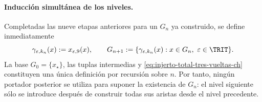 \paragraph{Inducción simultánea de los niveles.}
Completadas las nueve etapas anteriores para un \(G_n\) ya construido,
se define inmediatamente
\begin{equation}
 \gamma_{\varepsilon,k_n}(x):=x_{\varepsilon,9}(x),\qquad
 G_{n+1}:=\{\gamma_{\varepsilon,k_n}(x):
       x\in G_n,\ \varepsilon\in\TRIT\}.
 \label{eq:injerto-total-tres-vueltas-ch}
\end{equation}
\label{eq:tres-vueltas-tpk-ch}
La base \(G_0=\{x_\star\}\), las tuplas intermedias y
\eqref{eq:injerto-total-tres-vueltas-ch} constituyen una única definición por
recursión sobre \(n\). Por tanto, ningún portador posterior se utiliza para
suponer la existencia de \(G_n\): el nivel siguiente sólo se introduce
después de construir todas sus aristas desde el nivel precedente.


